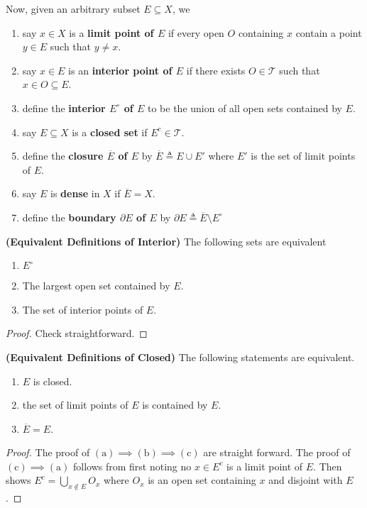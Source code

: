\documentclass{report}
\begin{document}
\begin{mdframed}
Now, given an arbitrary subset $E\subseteq X$, we 
\begin{enumerate}[label=(\alph*)]
  \item say $x\in X$ is a \textbf{limit point of $E$} if every open $O$ containing $x$ contain a point $y\in E$ such that $y \neq x$.
  \item say $x\in E$ is an \textbf{interior point of $E$} if there exists $O\in \mathscr{T }$ such that $x \in O \subseteq E$.
  \item define the \textbf{interior $E^\circ $ of $E$} to be the union of all open sets contained by  $E$.
   \item say $E\subseteq X$ is a \textbf{closed set} if $E^c \in \mathscr{T }$.
   \item define the \textbf{closure $\overline{E}$ of $E$} by $\overline{E}\triangleq E\cup E'$ where $E'$ is the set of limit points of $E$. 
    \item say $E$ is \textbf{dense} in $X$ if  $\overline{E}=X$.
    \item define the \textbf{boundary $\partial E$ of $E$} by $\partial E\triangleq \overline{E}\setminus E^\circ $
\end{enumerate}
\end{mdframed}
\begin{theorem}
\textbf{(Equivalent Definitions of Interior)} The following sets are equivalent
\begin{enumerate}[label=(\alph*)]
  \item $E^\circ $
  \item The largest open set contained by $E$.
  \item The set of interior points of $E$.
\end{enumerate}
\end{theorem}
\begin{proof}
Check straightforward.
\end{proof}
\begin{theorem}
\textbf{(Equivalent Definitions of Closed)} The following statements are equivalent.
\begin{enumerate}[label=(\alph*)]
  \item $E$ is closed.
  \item the set of limit points of $E$ is contained by $E$.
  \item $\overline{E}=E$.
\end{enumerate}
\end{theorem}
\begin{proof}
The proof of $(\text{a})\implies (\text{b})\implies (\text{c})$ are straight forward. The proof of $(\text{c})\implies (\text{a})$ follows from first noting no  $x\in E^c$ is a limit point of $E$. Then shows $E^c = \bigcup_{x \not \in E}O_x$ where $O_x$ is an open set containing $x$ and disjoint with $E$.
\end{proof}
\end{document}
